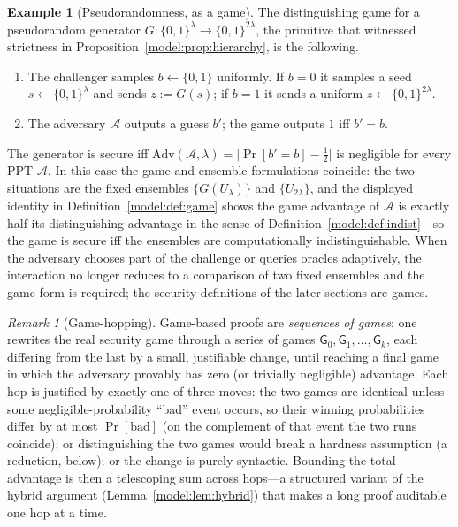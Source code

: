 \documentclass[11pt,a4paper]{article}
\theoremstyle{definition}
\newtheorem{example}[theorem]{Example}
\theoremstyle{remark}
\newtheorem{remark}[theorem]{Remark}
\begin{document}
\begin{example}[Pseudorandomness, as a game]
\label{model:exp:prg-game}
The distinguishing game for a pseudorandom generator
\(G : \{0,1\}^\lambda \to \{0,1\}^{2\lambda}\), the primitive that
witnessed strictness in Proposition~\ref{model:prop:hierarchy}, is the
following.
\begin{enumerate}
\item The challenger samples \(b \leftarrow \{0,1\}\) uniformly. If
  \(b = 0\) it samples a seed \(s \leftarrow \{0,1\}^\lambda\) and
  sends \(z := G(s)\); if \(b = 1\) it sends a uniform
  \(z \leftarrow \{0,1\}^{2\lambda}\).
\item The adversary \(\mathcal{A}\) outputs a guess \(b'\); the game
  outputs \(1\) iff \(b'=b\).
\end{enumerate}
The generator is secure iff
\(\mathrm{Adv}(\mathcal{A},\lambda)=\bigl|\Pr[b'=b]-\tfrac12\bigr|\)
is negligible for every PPT \(\mathcal{A}\). In this case the game
and ensemble formulations coincide: the two situations are the fixed
ensembles \(\{G(U_\lambda)\}\) and \(\{U_{2\lambda}\}\), and the
displayed identity in Definition~\ref{model:def:game} shows the game
advantage of \(\mathcal{A}\) is exactly half its distinguishing
advantage in the sense of Definition~\ref{model:def:indist}---so the
game is secure iff the ensembles are computationally
indistinguishable. When the adversary chooses part of the challenge or
queries oracles adaptively, the interaction no longer reduces to a
comparison of two fixed ensembles and the game form is required; the
security definitions of the later sections are games.
\end{example}

\begin{remark}[Game-hopping]\label{model:rem:game-hopping}
Game-based proofs are \emph{sequences of games}: one rewrites the real
security game through a series of games
\(\mathsf{G}_0, \mathsf{G}_1, \dots, \mathsf{G}_k\),
each differing from the last by a small, justifiable change, until
reaching a final game in which the adversary provably has zero (or
trivially negligible) advantage. Each hop is justified by exactly one
of three moves: the two games are identical unless some
negligible-probability ``bad'' event occurs, so their winning
probabilities differ by at most \(\Pr[\text{bad}]\) (on the complement
of that event the two runs coincide); or distinguishing the two games
would break a hardness assumption (a reduction, below); or the change
is purely syntactic. Bounding the total advantage is then a
telescoping sum across hops---a structured variant of the hybrid
argument (Lemma~\ref{model:lem:hybrid}) that makes a long proof
auditable one hop at a time.
\end{remark}
\end{document}
